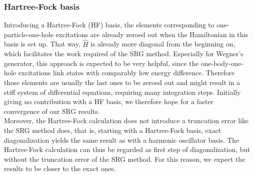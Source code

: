 \subsubsection{Hartree-Fock basis}

Introducing a Hartree-Fock (HF) basis, the elements corresponding to one-particle-one-hole excitations are already zeroed out when the Hamiltonian in this basis is set up. That way, $\hat{H}$ is already more diagonal from the beginning on, which facilitates the work required of the SRG method. Especially for Wegner's generator, this approach is expected to be very helpful, since the one-body-one-hole excitations link states with comparably low energy difference. Therefore those elements are usually the last ones to be zeroed out and might result in a stiff system of differential equations, requiring many integration steps. Initially giving no contribution with a HF basis, we therefore hope for a faster convergence of our SRG results.\\
Moreover, the Hartree-Fock calculation does not introduce a truncation error like the SRG method does, that is, starting with a Hartree-Fock basis, exact diagonalization yields the same result as with a harmonic oscillator basis. The Hartree-Fock calculation can thus be regarded as first step of diagonalization, but without the truncation error of the SRG method. For this reason, we expect the results to be closer to the exact ones.

